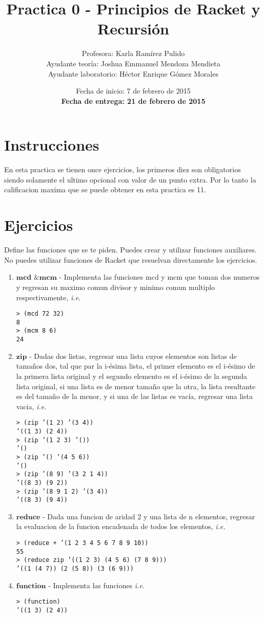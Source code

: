 \documentclass{article}
\author{Profesora: Karla Ramírez Pulido\\
  Ayudante teoría: Joshua Emmanuel Mendoza Mendieta\\
  Ayudante laboratorio: Héctor Enrique Gómez Morales}
\title{Practica 0 - Principios de Racket y Recursión}
\date{Fecha de inicio: 7 de febrero de 2015\\
  \textbf{Fecha de entrega: 21 de febrero de 2015}}
\begin{document}
\maketitle
\section{Instrucciones}
En esta practica se tienen once ejercicios, los primeros diez son
obligatorios siendo solamente el ultimo opcional con valor de un punto
extra. Por lo tanto la calificacion maxima que se puede obtener en
esta practica es 11.
\section{Ejercicios}
Define las funciones que se te piden. Puedes crear y utilizar
funciones auxiliares. No puedes utilizar funciones de Racket que
resuelvan directamente los ejercicios.
\begin{enumerate}
\item $\textbf{mcd \& mcm}$ - Implementa las funciones mcd y mcm que
  toman dos numeros y regresan su maximo comun divisor y minimo comun
  multiplo respectivamente, \textit{i.e.}
\begin{verbatim}
> (mcd 72 32)
8
> (mcm 8 6)
24
\end{verbatim}
\item $\textbf{zip}$ - Dadas dos listas, regresar una lista cuyos elementos son
  listas de tamaños dos, tal que par la i-ésima lista, el primer
  elemento es el i-ésimo de la primera lista original y el segundo
  elemento es el i-ésimo de la segunda lista original, si una lista es
de menor tamaño que la otra, la lista resultante es del tamaño de la
menor, y si una de las listas es vacía, regresar una lista vacia,
\textit{i.e.}
\begin{verbatim}
> (zip ’(1 2) ’(3 4))
’((1 3) (2 4))
> (zip ’(1 2 3) ’())
’()
> (zip ’() ’(4 5 6))
’()
> (zip ’(8 9) ’(3 2 1 4))
’((8 3) (9 2))
> (zip ’(8 9 1 2) ’(3 4))
’((8 3) (9 4))
\end{verbatim}
\newpage
\item $\textbf{reduce}$ - Dada una funcion de aridad 2 y una lista de
  n elementos, regresar la evaluacion de la funcion encadenada de
  todos los elementos, \textit{i.e.}
\begin{verbatim}
> (reduce + ’(1 2 3 4 5 6 7 8 9 10))
55
> (reduce zip ’((1 2 3) (4 5 6) (7 8 9)))
’((1 (4 7)) (2 (5 8)) (3 (6 9)))
\end{verbatim}
\item $\textbf{function}$ - Implementa las funciones 
\textit{i.e.}
\begin{verbatim}
> (function)
’((1 3) (2 4))
\end{verbatim}
\end{enumerate}
\end{document}
